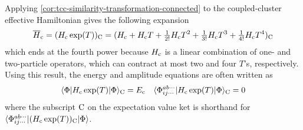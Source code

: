 \documentclass[11pt]{article}
\numberwithin{equation}{section}
\begin{document}
\begin{cor}
\label{cor:tcc-similarity-transformation-connected}
\end{cor}


\begin{rmk}\label{rmk:connected-expansion}
Applying \cref{cor:tcc-similarity-transformation-connected} to the coupled-cluster effective Hamiltonian gives the following expansion
\begin{align*}
  \overline{H}_{\mathrm{c}}
=
  (H_{\mathrm{c}}\,
   \mathrm{exp}(T))_{\mathrm{C}}
=
  (
    H_{\mathrm{c}}
  +
    H_{\mathrm{c}}
    T
  +
    \tfrac{1}{2!}
    H_{\mathrm{c}}
    T^2
  +
    \tfrac{1}{3!}
    H_{\mathrm{c}}
    T^3
  +
    \tfrac{1}{4!}
    H_{\mathrm{c}}
    T^4
  )_{\mathrm{C}}
\end{align*}
which ends at the fourth power because $H_{\mathrm{c}}$ is a linear combination of one- and two-particle operators, which can contract at most two and four $T$'s, respectively.
Using this result, the energy and amplitude equations are often written as
\begin{align}
\label{eq:traditional-cc-equations-2}
  \langle\Phi |H_{\mathrm{c}}\,\mathrm{exp}(T)|\Phi \rangle_{\mathrm{C}}
=
  E_{\mathrm{c}}
&&
  \langle\Phi _{ij\cdots}^{ab\cdots}|H_{\mathrm{c}}\,\mathrm{exp}(T)|\Phi \rangle_{\mathrm{C}}
=
  0
\end{align}
where the subscript $\mathrm{C}$ on the expectation value ket is shorthand for
$
  \langle\Phi _{ij\cdots}^{ab\cdots}|(H_{\mathrm{c}}\,\mathrm{exp}(T))_{\mathrm{C}}|\Phi \rangle
$.
\end{rmk}
\end{document}
